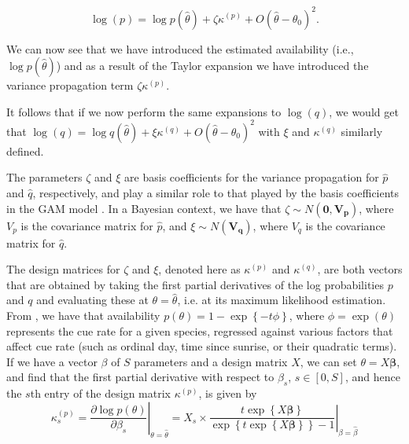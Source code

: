 \documentclass[12pt]{article}
\begin{document}
$$\log(p) = \log p(\hat{\theta}) + \zeta\kappa^{(p)} + O(\hat{\theta} - \theta_0)^2.$$

We can now see that we have introduced the estimated availability (i.e., $\log p(\hat{\theta})$) and as a result of the Taylor expansion we have introduced the variance propagation term $\zeta\kappa^{(p)}$.

\par It follows that if we now perform the same expansions to $\log(q)$, we would get that $\log(q) = \log q(\hat{\theta}) + \xi\kappa^{(q)} + O(\hat{\theta} - \theta_0)^2$ with $\xi$ and $\kappa^{(q)}$ similarly defined.

\par The parameters $\zeta$ and $\xi$ are basis coefficients for the variance propagation for $\hat{p}$ and $\hat{q}$, respectively, and play a similar role to that played by the basis coefficients in the GAM model \citep{bravington_variance_2021}. 
In a Bayesian context, we have that $\zeta \sim N(\boldsymbol{0}, \boldsymbol{V_p})$, where $V_p$ is the covariance matrix for $\hat{p}$, and $\xi \sim N(\boldsymbol{V_q})$, where $V_q$ is the covariance matrix for $\hat{q}$.

\par The design matrices for $\zeta$ and $\xi$, denoted here as $\kappa^{(p)}$ and $\kappa^{(q)}$, are both vectors that are obtained by taking the first partial derivatives of the log probabilities $p$ and $q$ and evaluating these at $\theta = \hat{\theta}$, i.e. at its maximum likelihood estimation. 
From \citet{solymos_calibrating_2013}, we have that availability $p(\theta) = 1 - \exp\left\{-t\phi\right\}$, where $\phi = \exp\left(\theta\right)$ represents the cue rate for a given species, regressed against various factors that affect cue rate (such as ordinal day, time since sunrise, or their quadratic terms). 
If we have a vector {\boldmath$\beta$} of $S$ parameters and a design matrix $X$, we can set $\theta = X\boldsymbol{\beta}$, and find that the first partial derivative with respect to $\beta_s$, $s \in \left[0, S\right]$, and hence the $s$th entry of the design matrix $\kappa^{(p)}$, is given by
\begin{equation*}\label{kappa_p}
	\kappa_{s}^{(p)} = \left.\dfrac{\partial \log p(\theta)}{\partial \beta_s}\right\vert_{\theta = \hat{\theta}} = \left. X_s \times \dfrac{t \exp\left\{X\boldsymbol{\beta}\right\}}{\exp\left\{t \exp\left\{X\boldsymbol{\beta}\right\}\right\} - 1} \right\vert_{\beta = \hat{\beta}}
\end{equation*}
\end{document}
